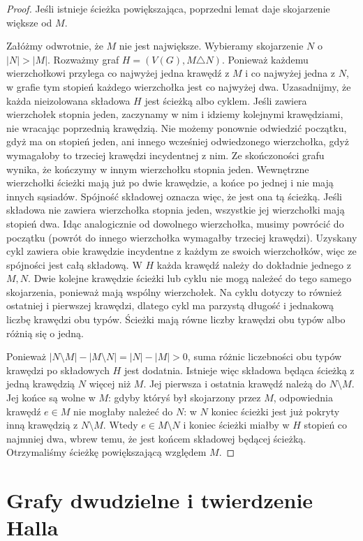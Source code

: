\begin{proof}
Jeśli istnieje ścieżka powiększająca, poprzedni lemat
daje skojarzenie większe od $M$.

Załóżmy odwrotnie, że $M$ nie jest największe.
Wybieramy skojarzenie $N$ o $|N|>|M|$.
Rozważmy graf $H=(V(G),M\triangle N)$.
Ponieważ każdemu wierzchołkowi przylega co najwyżej
jedna krawędź z $M$ i co najwyżej jedna z $N$,
w grafie tym stopień każdego wierzchołka jest co
najwyżej dwa. Uzasadnijmy, że każda nieizolowana
składowa $H$ jest ścieżką albo cyklem. Jeśli zawiera
wierzchołek stopnia jeden, zaczynamy w nim i idziemy
kolejnymi krawędziami, nie wracając poprzednią krawędzią.
Nie możemy ponownie odwiedzić początku, gdyż ma on
stopień jeden, ani innego wcześniej odwiedzonego
wierzchołka, gdyż wymagałoby to trzeciej krawędzi
incydentnej z nim. Ze skończoności grafu wynika,
że kończymy w innym wierzchołku stopnia jeden.
Wewnętrzne wierzchołki ścieżki mają już po dwie
krawędzie, a końce po jednej i nie mają innych sąsiadów.
Spójność składowej oznacza więc, że jest ona tą ścieżką.
Jeśli składowa nie zawiera wierzchołka stopnia jeden,
wszystkie jej wierzchołki mają stopień dwa.
Idąc analogicznie od dowolnego wierzchołka, musimy
powrócić do początku (powrót do innego wierzchołka
wymagałby trzeciej krawędzi). Uzyskany cykl zawiera obie krawędzie incydentne
z każdym ze swoich wierzchołków, więc ze spójności
jest całą składową. W $H$ każda krawędź należy do
dokładnie jednego z $M,N$. Dwie kolejne krawędzie
ścieżki lub cyklu nie mogą należeć do tego samego
skojarzenia, ponieważ mają wspólny wierzchołek.
Na cyklu dotyczy to również ostatniej i pierwszej
krawędzi, dlatego cykl ma parzystą długość i jednakową
liczbę krawędzi obu typów. Ścieżki mają równe liczby krawędzi
obu typów albo różnią się o jedną.

Ponieważ $|N\setminus M|-|M\setminus N|=|N|-|M|>0$,
suma różnic liczebności obu typów krawędzi po
składowych $H$ jest dodatnia. Istnieje więc składowa
będąca ścieżką z jedną krawędzią $N$ więcej
niż $M$. Jej pierwsza i ostatnia krawędź
należą do $N\setminus M$. Jej końce są wolne
w $M$: gdyby któryś był skojarzony przez $M$,
odpowiednia krawędź $e\in M$ nie mogłaby należeć do $N$:
w $N$ koniec ścieżki jest już pokryty inną krawędzią
z $N\setminus M$. Wtedy $e\in M\setminus N$
i koniec ścieżki miałby w $H$ stopień co najmniej dwa,
wbrew temu, że jest końcem składowej będącej ścieżką. Otrzymaliśmy ścieżkę
powiększającą względem $M$.
\end{proof}

\section{Grafy dwudzielne i twierdzenie Halla}
\label{sec:tg-hall}

